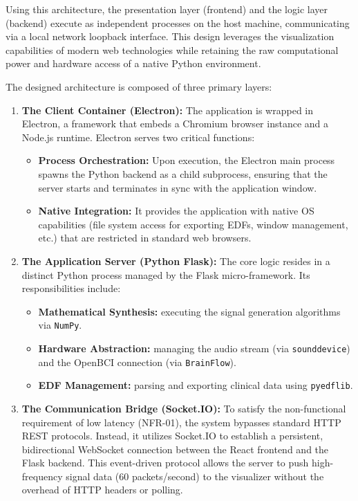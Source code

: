 \documentclass[../00_Main.tex]{subfiles}
\begin{document}
Using this architecture, the presentation layer (frontend) and the logic layer (backend) execute as independent processes on the host machine, communicating via a local network loopback interface. This design leverages the visualization capabilities of modern web technologies while retaining the raw computational power and hardware access of a native Python environment.

The designed architecture is composed of three primary layers:

\begin{enumerate}
    \item \textbf{The Client Container (Electron):} The application is wrapped in Electron, a framework that embeds a Chromium browser instance and a Node.js runtime. Electron serves two critical functions:
    \begin{itemize}
        \item \textbf{Process Orchestration:} Upon execution, the Electron main process spawns the Python backend as a child subprocess, ensuring that the server starts and terminates in sync with the application window.
        \item \textbf{Native Integration:} It provides the application with native OS capabilities (file system access for exporting EDFs, window management, etc.) that are restricted in standard web browsers.
    \end{itemize}

    \item \textbf{The Application Server (Python Flask):} The core logic resides in a distinct Python process managed by the Flask micro-framework. Its responsibilities include:
    \begin{itemize}
        \item \textbf{Mathematical Synthesis:} executing the signal generation algorithms via \texttt{NumPy}.
        \item \textbf{Hardware Abstraction:} managing the audio stream (via \texttt{sounddevice}) and the OpenBCI connection (via \texttt{BrainFlow}).
        \item \textbf{EDF Management:} parsing and exporting clinical data using \texttt{pyedflib}.
    \end{itemize}

    \item \textbf{The Communication Bridge (Socket.IO):} To satisfy the non-functional requirement of low latency (NFR-01), the system bypasses standard HTTP REST protocols. Instead, it utilizes Socket.IO to establish a persistent, bidirectional WebSocket connection between the React frontend and the Flask backend. This event-driven protocol allows the server to push high-frequency signal data (60 packets/second) to the visualizer without the overhead of HTTP headers or polling.
\end{enumerate}
\end{document}
